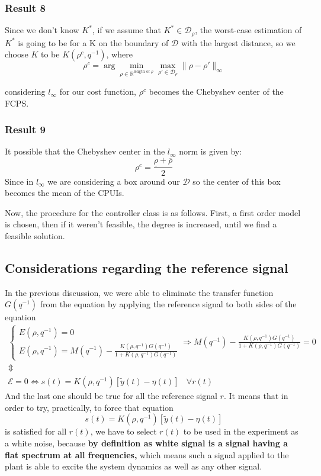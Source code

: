 \subsubsection{Result 8}
Since we don't know $K^{*}$, if we assume that $K^{*} \in \mathcal{D}_\rho$, the worst-case estimation of $K^{*}$ is going to be for a K on the boundary of $\mathcal{D}$ with the largest distance, so we choose $K$ to be $K(\rho^c,q^{-1})$, where
\[
\rho^c = \arg \min_{\rho \in \mathbb{R}^{\text{length of $\rho$}}} \max_{\rho' \in \mathcal{D}_\rho} \|\rho - \rho'\|_\infty
\]

considering $l_\infty$ for our cost function, $\rho^c$ becomes the Chebyshev center of the FCPS.


\subsubsection{Result 9}
It possible that the Chebyshev center in the $l_\infty$ norm is given by:
\[
\rho^c = \frac{\underline{\rho}+\overline{\rho}}{2}
\]
Since in $l_\infty$ we are considering a box around our $\mathcal{D}$ so the center of this box becomes the mean of the CPUIs.

Now, the procedure for the controller class is as follows. First, a first order model is chosen, then if it weren't feasible, the degree is increased, until we find a feasible solution.

\subsection{Considerations regarding the reference signal}
In the previous discussion, we were able to eliminate the transfer function $G(q^{-1})$ from the equation by applying the reference signal to both sides of the equation 
\[
\begin{array}{c}
\begin{cases}
E(\rho,q^{-1}) = 0\\
E(\rho,q^{-1}) = M(q^{-1}) - \frac{K(\rho,q^{-1})G(q^{-1})}{1 + K(\rho,q^{-1})G(q^{-1})}
\end{cases}
\Rightarrow M(q^{-1}) - \frac{K(\rho,q^{-1})G(q^{-1})}{1 + K(\rho,q^{-1})G(q^{-1})} = 0\\
 \Updownarrow\\
 \mathcal{E} = 0 \Leftrightarrow s(t) = K(\rho,q^{-1})\left[\tilde{y}(t)- \eta(t)\right] \:\:\:\: \forall r(t)
\end{array}
\]
And the last one should be true for all the reference signal $r$. It means that in order to try, practically, to force that equation
\[
 s(t) = K(\rho,q^{-1})\left[\tilde{y}(t)- \eta(t)\right] 
\]
is satisfied for all $r(t)$, we have to select $r(t)$ to be used in the experiment as a white noise, because \textbf{by definition as white signal is a signal having a flat spectrum at all frequencies,} which means such a signal applied to the plant is able to excite the system dynamics as well as any other signal.

